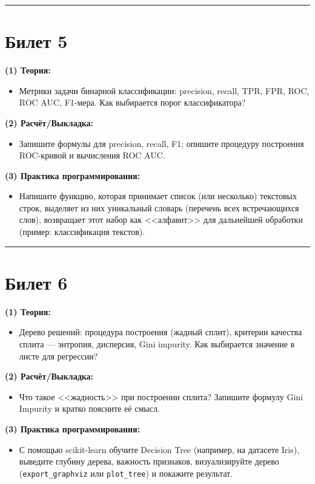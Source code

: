 \documentclass[a4paper,12pt]{article}
\begin{document}
\noindent\rule{\textwidth}{0.4pt}
\newpage

\section*{Билет 5}
\textbf{(1) Теория:}
\begin{itemize}
  \item Метрики задачи бинарной классификации: precision, recall, TPR, FPR, ROC, ROC AUC, F1-мера. Как выбирается порог классификатора?
\end{itemize}

\textbf{(2) Расчёт/Выкладка:}
\begin{itemize}
  \item Запишите формулы для precision, recall, F1; опишите процедуру построения ROC-кривой и вычисления ROC AUC.
\end{itemize}

\textbf{(3) Практика программирования:}
\begin{itemize}
  \item Напишите функцию, которая принимает список (или несколько) текстовых строк, выделяет из них уникальный словарь (перечень всех встречающихся слов), возвращает этот набор как <<алфавит>> для дальнейшей обработки (пример: классификация текстов).
\end{itemize}

\noindent\rule{\textwidth}{0.4pt}
\newpage

\section*{Билет 6}
\textbf{(1) Теория:}
\begin{itemize}
  \item Дерево решений: процедура построения (жадный сплит), критерии качества сплита --- энтропия, дисперсия, Gini impurity. Как выбирается значение в листе для регрессии?
\end{itemize}

\textbf{(2) Расчёт/Выкладка:}
\begin{itemize}
  \item Что такое <<жадность>> при построении сплита? Запишите формулу Gini Impurity и кратко поясните её смысл.
\end{itemize}

\textbf{(3) Практика программирования:}
\begin{itemize}
  \item С помощью scikit-learn обучите Decision Tree (например, на датасете Iris), выведите глубину дерева, важность признаков, визуализируйте дерево (\texttt{export\_graphviz} или \texttt{plot\_tree}) и покажите результат.
\end{itemize}
\end{document}
